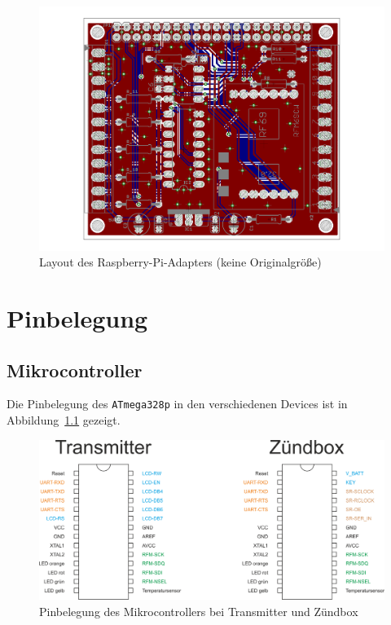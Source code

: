 \documentclass[paper=a4, parskip, numbers=noenddot, toc=listof, headsepline]{scrbook}
\begin{document}
			\begin{figure}
				\centering
				\includegraphics[angle=-90,width=.95\textwidth,keepaspectratio]{Bilder/Piadapterlayout}
				\caption{Layout des Raspberry-Pi-Adapters (keine Originalgröße)}
				\label{fig:piadapterlayout}
			\end{figure}

			\begin{refsection}
				\newrefcontext[sorting=nty]
				\nocite{*} %
				\printbibliography[title=Datenblätter, heading=bibnumbered]
				\label{sec:datasheets}
			\end{refsection}

		\chapter{Pinbelegung}
			\label{ch:pinbelegung}

			\section{Mikrocontroller}
				Die Pinbelegung des \texttt{ATmega328p} in den verschiedenen Devices ist in Abbildung~\ref{fig:pinout} gezeigt.

				\begin{figure}
					\centering
					\includegraphics[width=.7\textwidth]{Bilder/pinout}
					\caption{Pinbelegung des Mikrocontrollers bei Transmitter und Zündbox}
					\label{fig:pinout}
				\end{figure}
\end{document}
